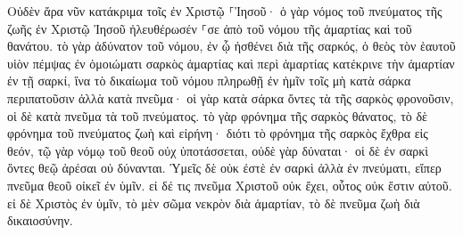 \documentclass{openreader}
\begin{document}
Οὐδὲν ἄρα νῦν κατάκριμα τοῖς ἐν Χριστῷ ⸀Ἰησοῦ· 
ὁ γὰρ νόμος τοῦ πνεύματος τῆς ζωῆς ἐν Χριστῷ Ἰησοῦ ἠλευθέρωσέν ⸀σε ἀπὸ τοῦ νόμου τῆς ἁμαρτίας καὶ τοῦ θανάτου. 
τὸ γὰρ ἀδύνατον τοῦ νόμου, ἐν ᾧ ἠσθένει διὰ τῆς σαρκός, ὁ θεὸς τὸν ἑαυτοῦ υἱὸν πέμψας ἐν ὁμοιώματι σαρκὸς ἁμαρτίας καὶ περὶ ἁμαρτίας κατέκρινε τὴν ἁμαρτίαν ἐν τῇ σαρκί, 
ἵνα τὸ δικαίωμα τοῦ νόμου πληρωθῇ ἐν ἡμῖν τοῖς μὴ κατὰ σάρκα περιπατοῦσιν ἀλλὰ κατὰ πνεῦμα· 
οἱ γὰρ κατὰ σάρκα ὄντες τὰ τῆς σαρκὸς φρονοῦσιν, οἱ δὲ κατὰ πνεῦμα τὰ τοῦ πνεύματος. 
τὸ γὰρ φρόνημα τῆς σαρκὸς θάνατος, τὸ δὲ φρόνημα τοῦ πνεύματος ζωὴ καὶ εἰρήνη· 
διότι τὸ φρόνημα τῆς σαρκὸς ἔχθρα εἰς θεόν, τῷ γὰρ νόμῳ τοῦ θεοῦ οὐχ ὑποτάσσεται, οὐδὲ γὰρ δύναται· 
οἱ δὲ ἐν σαρκὶ ὄντες θεῷ ἀρέσαι οὐ δύνανται. 
Ὑμεῖς δὲ οὐκ ἐστὲ ἐν σαρκὶ ἀλλὰ ἐν πνεύματι, εἴπερ πνεῦμα θεοῦ οἰκεῖ ἐν ὑμῖν. εἰ δέ τις πνεῦμα Χριστοῦ οὐκ ἔχει, οὗτος οὐκ ἔστιν αὐτοῦ. 
εἰ δὲ Χριστὸς ἐν ὑμῖν, τὸ μὲν σῶμα νεκρὸν διὰ ἁμαρτίαν, τὸ δὲ πνεῦμα ζωὴ διὰ δικαιοσύνην. 
\end{document}
